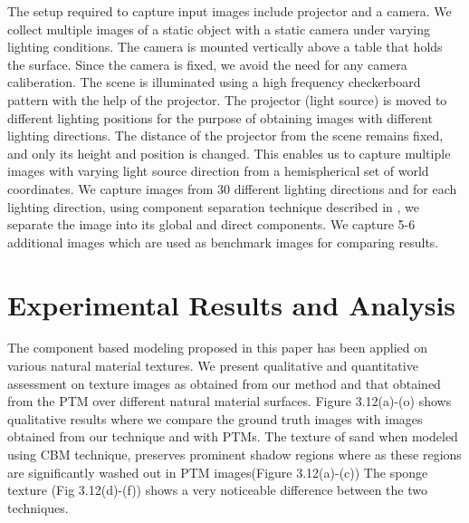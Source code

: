 
The setup required to capture input images include projector and a camera.
We collect multiple images of a static object with a static camera under varying
lighting conditions. The
camera is mounted vertically above a table that holds the surface. Since the camera is fixed, we avoid the
need for any camera caliberation. 
The scene is illuminated using a high frequency checkerboard pattern with the help of the projector. The
projector (light source) is moved to different lighting positions for the purpose of obtaining
images with different lighting directions. 
The distance of the projector from
the scene remains fixed, and only its height and position is changed. This
enables us to capture multiple images with varying light source direction from a hemispherical set of world
coordinates. We capture images from 30 different lighting directions and for each
lighting direction, using component separation technique described in \cite{chap3-1},
we separate the image into its global and direct components. We capture 5-6 additional images which are used as 
benchmark images for comparing results.  


\section{Experimental Results and Analysis}

The component based modeling proposed in this paper has been applied on various
natural material textures. We present qualitative and quantitative assessment on
texture images as obtained from our method and that obtained from the PTM over
different natural material surfaces. Figure 3.12(a)-(o) shows qualitative results where we compare the
ground truth images with images obtained from our technique and with PTMs. The
texture of sand when modeled using CBM technique, preserves prominent shadow
regions where as these regions are significantly washed out in PTM images(Figure
3.12(a)-(c)) The sponge texture (Fig 3.12(d)-(f)) shows a very noticeable difference
between the two techniques.

